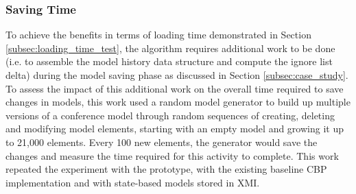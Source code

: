 \documentclass[12pt, a4paper]{report} \usepackage[titletoc]{appendix}
\begin{document}
\subsubsection{Saving Time}
\label{subsec:saving_time_test}

To achieve the benefits in terms of loading time demonstrated in Section \ref{subsec:loading_time_test}, the algorithm requires additional work to be done (i.e. to assemble the model history data structure and compute the ignore list delta) during the model saving phase as discussed in Section \ref{subsec:case_study}. To assess the impact of this additional work on the overall time required to save changes in models, this work used a random model generator to build up multiple versions of a conference model through random sequences of creating, deleting and modifying model elements, starting with an empty model and growing it up to 21,000 elements. Every 100 new elements, the generator would save the changes and measure the time required for this activity to complete. This work repeated the experiment with the prototype, with the existing baseline CBP implementation and with state-based models stored in XMI.
\end{document}
